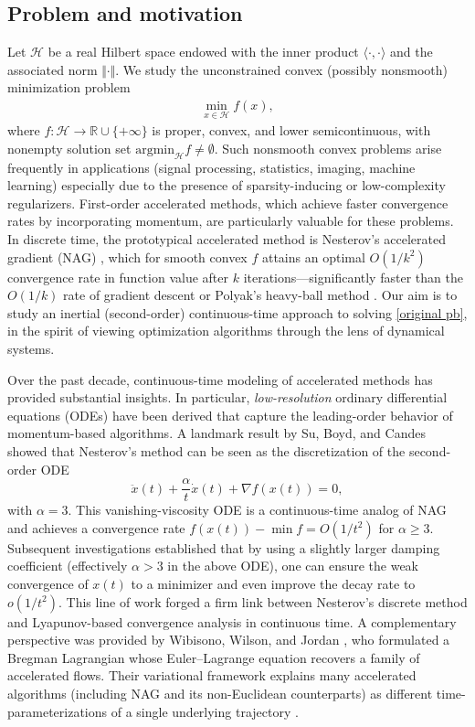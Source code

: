 \documentclass[11pt]{article}
\numberwithin{equation}{section}
\begin{document}
\subsection{Problem and motivation}

Let $\mathcal{H} $ be a real Hilbert space endowed with the inner product $\langle \cdot, \cdot \rangle$ and the associated norm $\Vert \cdot \Vert$. We study the unconstrained convex (possibly nonsmooth) minimization problem
\begin{align}
\label{original pb}
\min_{x\in\mathcal H} f(x),   
\end{align}
where $f:\mathcal{H}\to\mathbb{R}\cup\{+\infty\}$ is proper, convex, and lower semicontinuous, with nonempty solution set $\text{argmin}_{\mathcal{H}}f \neq \emptyset$. Such nonsmooth convex problems arise frequently in applications (signal processing, statistics, imaging, machine learning) especially due to the presence of sparsity-inducing or low-complexity regularizers. First-order {accelerated} methods, which achieve faster convergence rates by incorporating momentum, are particularly valuable for these problems. In discrete time, the prototypical accelerated method is {Nesterov’s accelerated gradient (NAG)} \cite{Nesterov1983}, which for smooth convex $f$ attains an optimal $O(1/k^2)$ convergence rate in function value after $k$ iterations—significantly faster than the $O(1/k)$ rate of gradient descent or Polyak’s heavy-ball method \cite{Polyak1964, Goujaud2025}. Our aim is to study an {inertial} (second-order) {continuous-time} approach to solving \eqref{original pb}, in the spirit of viewing optimization algorithms through the lens of dynamical systems. 

Over the past decade, continuous-time modeling of accelerated methods has provided substantial insights. In particular, \textit{low-resolution} ordinary differential equations (ODEs) have been derived that capture the leading-order behavior of momentum-based algorithms. A landmark result by Su, Boyd, and Candes \cite{Su2016} showed that Nesterov’s method can be seen as the discretization of the second-order ODE
\[
\ddot x(t) + \frac{\alpha}{t}\dot x(t) + \nabla f(x(t)) = 0,
\]
with $\alpha=3$. This vanishing-viscosity ODE is a continuous-time analog of NAG and achieves a convergence rate $f(x(t)) - \min f = O(1/t^2)$ for $\alpha \ge 3$. Subsequent investigations \cite{ACPR,AP_smallo} established that by using a slightly larger damping coefficient (effectively $\alpha > 3$ in the above ODE), one can ensure the weak convergence of $x(t)$ to a minimizer and even improve the decay rate to $o(1/t^2)$. This line of work forged a firm link between Nesterov’s discrete method and Lyapunov-based convergence analysis in continuous time. A complementary perspective was provided by Wibisono, Wilson, and Jordan \cite{Wibisono2016}, who formulated a Bregman Lagrangian whose Euler–Lagrange equation recovers a family of accelerated flows. Their variational framework explains many accelerated algorithms (including NAG and its non-Euclidean counterparts) as different time-parameterizations of a single underlying trajectory \cite{Wibisono2016}. 
\end{document}
